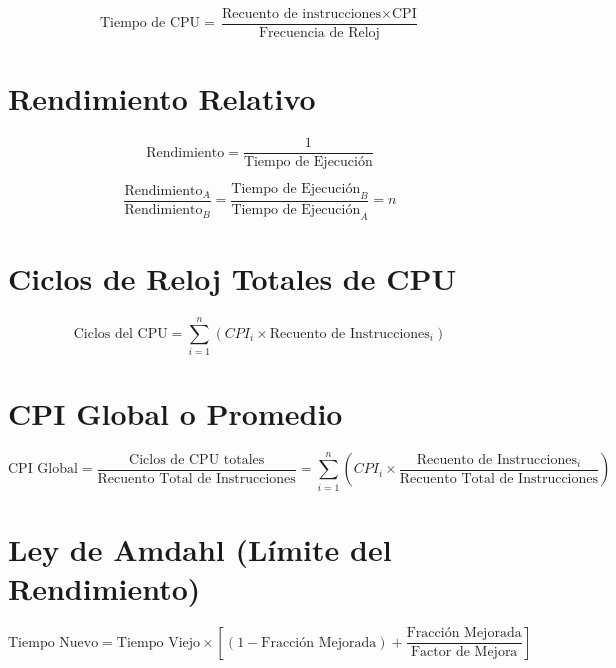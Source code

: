 \documentclass{article}
\begin{document}
$$\text{Tiempo de CPU} = \frac{\text{Recuento de instrucciones} \times \text{CPI}}{\text{Frecuencia de Reloj}}$$

\section{Rendimiento Relativo}
$$\text{Rendimiento} = \frac{1}{\text{Tiempo de Ejecución}}$$

$$\frac{\text{Rendimiento}_A}{\text{Rendimiento}_B} = \frac{\text{Tiempo de Ejecución}_B}{\text{Tiempo de Ejecución}_A} = n$$

\section{Ciclos de Reloj Totales de CPU}

$$\text{Ciclos del CPU} = \sum_{i=1}^{n} (CPI_i \times \text{Recuento de Instrucciones}_i)$$

\section{CPI Global o Promedio}
$$\text{CPI Global} = \frac{\text{Ciclos de CPU totales}}{\text{Recuento Total de Instrucciones}} = \sum_{i=1}^{n} \left( CPI_i \times \frac{\text{Recuento de Instrucciones}_i}{\text{Recuento Total de Instrucciones}} \right)$$

\section{Ley de Amdahl (Límite del Rendimiento)}
$$\text{Tiempo Nuevo} = \text{Tiempo Viejo} \times \left[ (1 - \text{Fracción Mejorada}) + \frac{\text{Fracción Mejorada}}{\text{Factor de Mejora}} \right]$$
\end{document}
